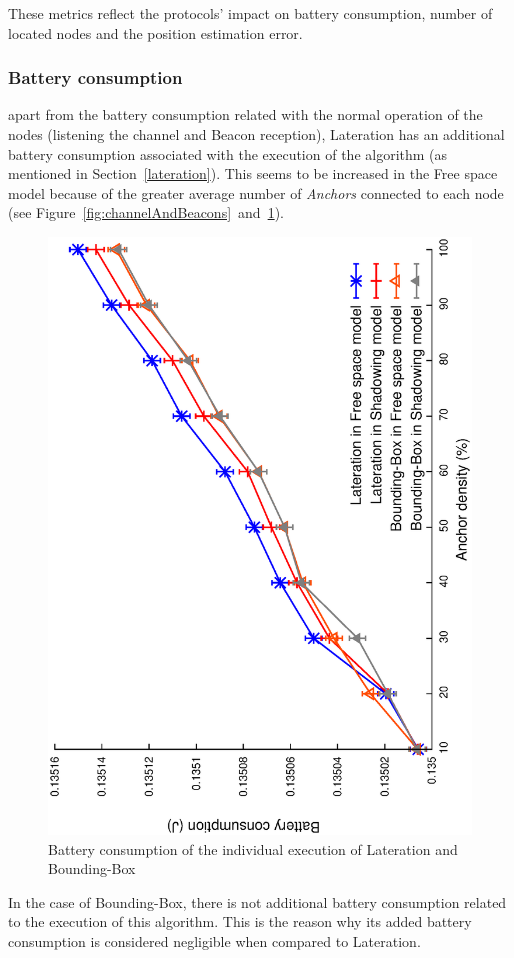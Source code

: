 These metrics reflect the protocols' impact on battery consumption, number of located nodes and the position estimation error.

\subsubsection{Battery consumption}\label{individual_battery_consumption}
apart from the battery consumption related with the normal operation of the nodes (listening the channel and Beacon reception), Lateration has an additional battery consumption associated with the execution of the algorithm (as mentioned in Section~\ref{lateration}). This seems to be increased in the Free space model because of the greater average number of \emph{Anchors} connected to each node (see Figure~\ref{fig:channelAndBeacons}~and~\ref{fig:battery}).

\begin{figure}[htbp]
  \centering
  \includegraphics[width=0.7\linewidth, angle = -90]{section4/figures/battery.eps}
  \caption{Battery consumption of the individual execution of Lateration and Bounding-Box
  \label{fig:battery}}
\end{figure}

In the case of Bounding-Box, there is not additional battery consumption related to the execution of this algorithm. This is the reason why its added battery consumption is considered negligible when compared to Lateration.

